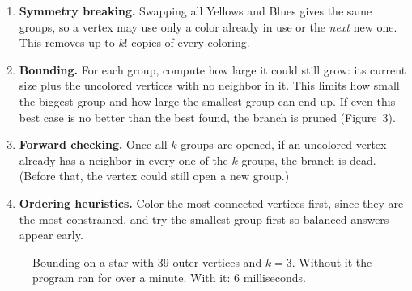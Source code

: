 \documentclass[11pt]{article}
\begin{document}
\begin{enumerate}
  \item \textbf{Symmetry breaking.} Swapping all Yellows and Blues gives the
        same groups, so a vertex may use only a color already in use or the
        \emph{next} new one. This removes up to $k!$ copies of every coloring.
  \item \textbf{Bounding.} For each group, compute how large it could still
        grow: its current size plus the uncolored vertices with no neighbor
        in it. This limits how small the biggest group and how large the
        smallest group can end up. If even this best case is no better than
        the best found, the branch is pruned (Figure~3).
  \item \textbf{Forward checking.} Once all $k$ groups are opened, if an
        uncolored vertex already has a neighbor in every one of the $k$
        groups, the branch is dead. (Before that, the vertex could still
        open a new group.)
  \item \textbf{Ordering heuristics.} Color the most-connected vertices
        first, since they are the most constrained, and try the smallest
        group first so balanced answers appear early.
\end{enumerate}

\begin{figure}[h]
\centering
{}
\caption{Bounding on a star with 39 outer vertices and $k=3$. Without it
the program ran for over a minute. With it: 6 milliseconds.}
\end{figure}
\end{document}
